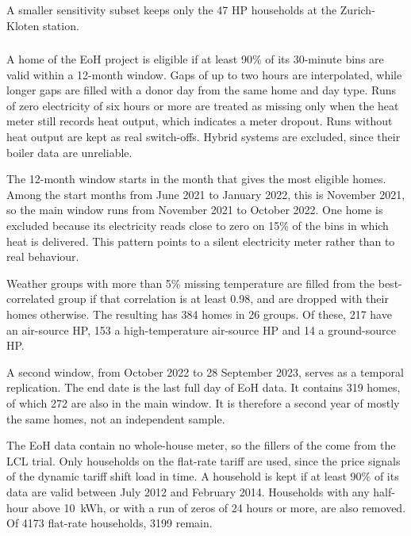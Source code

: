 A smaller sensitivity subset keeps only the 47 HP households at the Zurich-Kloten station. %

\subsubsection{\dataGB}
A home of the EoH project is eligible if at least 90\% of its 30-minute bins are valid within a 12-month window. Gaps of up to two hours are interpolated, while longer gaps are filled with a donor day from the same home and day type. Runs of zero electricity of six hours or more are treated as missing only when the heat meter still records heat output, which indicates a meter dropout. Runs without heat output are kept as real switch-offs. Hybrid systems are excluded, since their boiler data are unreliable.

The 12-month window starts in the month that gives the most eligible homes. Among the start months from June 2021 to January 2022, this is November 2021, so the main window runs from November 2021 to October 2022. One home is excluded because its electricity reads close to zero on 15\% of the bins in which heat is delivered. This pattern points to a silent electricity meter rather than to real behaviour.

Weather groups with more than 5\% missing temperature are filled from the best-correlated group if that correlation is at least 0.98, and are dropped with their homes otherwise. The resulting \dataGB{} has 384 homes in 26 groups. Of these, 217 have an air-source HP, 153 a high-temperature air-source HP and 14 a ground-source HP.

A second window, from October 2022 to 28 September 2023, serves as a temporal replication. The end date is the last full day of EoH data. It contains 319 homes, of which 272 are also in the main window. It is therefore a second year of mostly the same homes, not an independent sample.

The EoH data contain no whole-house meter, so the fillers of the \dataGB{} come from the LCL trial. Only households on the flat-rate tariff are used, since the price signals of the dynamic tariff shift load in time. A household is kept if at least 90\% of its data are valid between July 2012 and February 2014. Households with any half-hour above 10~kWh, or with a run of zeros of 24 hours or more, are also removed. Of \num{4173} flat-rate households, \num{3199} remain.

